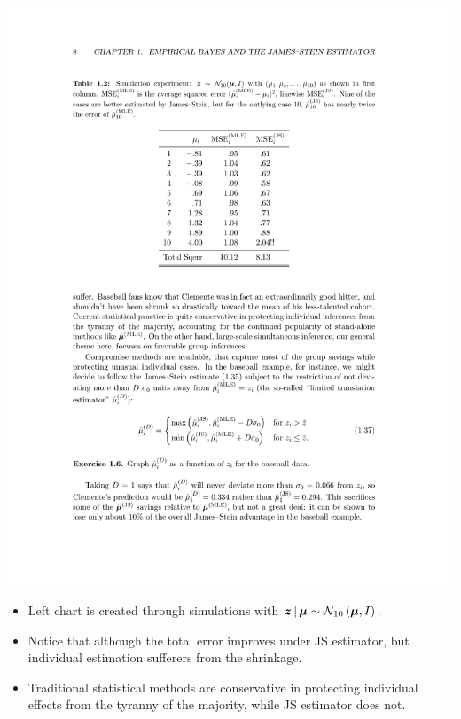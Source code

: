 \documentclass{beamer}
\begin{document}
\begin{frame}{}
	\begin{minipage}{.5\textwidth}
		\noindent\hspace{-0.6cm}
		\includegraphics[height=0.8\textheight]{figures/JS_bad}
	\end{minipage}%
	\begin{minipage}{.55\textwidth}
		\begin{itemize}
			\item
				Left chart is created through simulations with
				$\bfz\given\bfmu\sim\normal[10]{\bfmu,I}$.
			\item
				Notice that although the total error improves under JS
				estimator, but individual estimation sufferers from the
				shrinkage.
			\item
				Traditional statistical methods are conservative in
				protecting individual effects from the tyranny of the majority,
				while JS estimator does not.
		\end{itemize}
	\end{minipage}
\end{frame}
\end{document}
